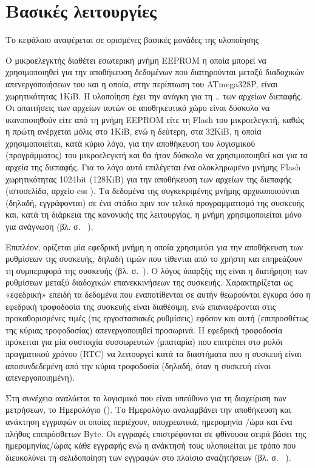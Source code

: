 \chapter{Βασικές λειτουργίες}
\label{ch:foundation}

Το κεφάλαιο αναφέρεται σε ορισμένες βασικές μονάδες της υλοποίησης

Ο μικροελεγκτής διαθέτει εσωτερική μνήμη EEPROM η οποία μπορεί να χρησιμοποιηθεί
για την αποθήκευση δεδομένων που διατηρούνται μεταξύ διαδοχικών απενεργοποιήσεων
του και η οποία, στην περίπτωση του ATmega328P, είναι χωρητικότητας 1KiB.
Η υλοποίηση έχει την ανάγκη για τη .. των αρχείων διεπαφής.
Οι απαιτήσεις των αρχείων αυτών σε αποθηκευτικό χώρο είναι δύσκολο να
ικανοποιηθούν είτε από τη μνήμη EEPROM είτε τη Flash του μικροελεγκτή, καθώς η
πρώτη ανέρχεται μόλις στο 1KiB, ενώ η δεύτερη, στα 32KiB, η οποία
χρησιμοποιείται, κατά κύριο λόγο, για την αποθήκευση του λογισμικού
(προγράμματος) του μικροελεγκτή και θα ήταν δύσκολο να χρησιμοποιηθεί και για
τα αρχεία της διεπαφής.
Για το λόγο αυτό επιλέγεται ένα ολοκληρωμένο μνήμης Flash χωρητικότητας 1024bit
(128KiB) για την αποθήκευση των αρχείων της διεπαφής (ιστοσελίδα, αρχείο
css ). Τα δεδομένα της συγκεκριμένης μνήμης αρχικοποιούνται (δηλαδή,
εγγράφονται) σε ένα στάδιο πριν τον τελικό προγραμματισμό της συσκευής και, κατά
τη διάρκεια της κανονικής της λειτουργίας, η μνήμη χρησιμοποιείται μόνο για
ανάγνωση (βλ.  σ.~%
\pageref{subsec:external-memory}).

Επιπλέον, ορίζεται μία εφεδρική μνήμη η οποία χρησιμεύει για την αποθήκευση των
ρυθμίσεων της συσκευής, δηλαδή τιμών που τίθενται από το χρήστη και επηρεάζουν
τη συμπεριφορά της συσκευής (βλ. σ.~\pageref{subsec:backup-memory}). Ο λόγος
ύπαρξής της είναι η διατήρηση των ρυθμίσεων μεταξύ διαδοχικών επανεκκινήσεων της
συσκευής. Χαρακτηρίζεται ως «εφεδρική» επειδή τα δεδομένα που εναποτίθενται σε
αυτήν θεωρούνται έγκυρα όσο η εφεδρική τροφοδοσία της συσκευής είναι διαθέσιμη,
ενώ επαναφέρονται στις προκαθορισμένες τιμές (τις εργοστασιακές ρυθμίσεις)
εφόσον και αυτή (επιπροσθέτως της κύριας τροφοδοσίας) απενεργοποιηθεί προσωρινά.
Η εφεδρική τροφοδοσία πρόκειται για μία συστοιχία συσσωρευτών (μπαταρία) που
επιτρέπει στο ρολόι πραγματικού χρόνου (RTC) να λειτουργεί κατά τα διαστήματα
που η συσκευή είναι αποσυνδεδεμένη από την κύρια τροφοδοσία (δηλαδή, όταν η
συσκευή είναι απενεργοποιημένη).

Στη συνέχεια αναλύεται το λογισμικό που είναι υπεύθυνο για τη διαχείριση των
μετρήσεων, το Ημερολόγιο (\pageref{sec:log}). Το Ημερολόγιο αναλαμβάνει την
αποθήκευση και ανάκτηση εγγραφών οι οποίες περιέχουν, υποχρεωτικά, ημερομηνία%
\slash{}ώρα και ένα πλήθος επιπρόσθετων Byte. Οι εγγραφές επιστρέφονται σε
φθίνουσα σειρά βάσει της ημερομηνίας\slash{}ώρας κάθε εγγραφής ενώ η ανάκτησή
τους υλοποιείται με τρόπο που διευκολύνει τη σελιδοποίηση των εγγραφών στο
πλαίσιο αναζητήσεων (βλ.  σ.~%
\pageref{subsec:network:measurement}).

